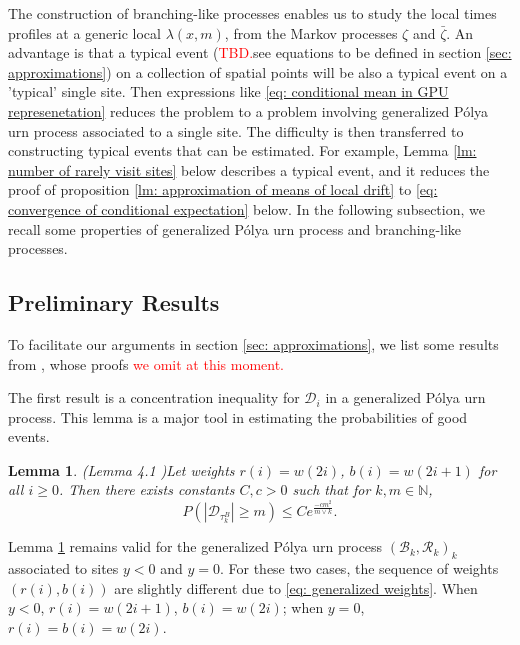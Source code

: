 \documentclass[twoside,12pt,a4paper]{article}
\newtheorem{lemma}{Lemma}[section]
\numberwithin{equation}{section}
\newcommand{\abs}[1]{\left\vert #1 \right\vert}
\newcommand\TBD{\textcolor{red}{TBD.}}
\begin{document}
	
	
	The construction of branching-like processes enables us to study the local times profiles at a generic local $\lambda(x,m)$, from the Markov processes $\zeta$ and $\bar{\zeta}$. An advantage is that a typical event (\TBD{see equations to be defined in section \ref{sec: approximations}}) on a collection of spatial points will be also a typical event on a 'typical' single site. Then expressions like \eqref{eq: conditional mean in GPU represenetation} reduces the problem to a problem involving generalized P\'{o}lya urn process associated to a single site. The difficulty is then transferred to constructing typical events that can be estimated. For example, Lemma \ref{lm: number of rarely visit sites} below describes a typical event, and it reduces the proof of proposition \ref{lm: approximation of means of local drift} to \eqref{eq: convergence of conditional expectation} below. In the following subsection, we recall some properties of generalized P\'{o}lya urn process and branching-like processes.
	
	\subsection{Preliminary Results}
	To facilitate our arguments in section \ref{sec: approximations}, we list some results from \cite{KMP22,T96}, whose proofs \textcolor{red}{we omit at this moment.}
	
	The first result is a concentration inequality for $\mathcal{D}_i$ in a generalized P\'{o}lya urn process. This lemma is a major tool in estimating the probabilities of good events.
	\begin{lemma}(Lemma 4.1 \cite{KMP22})\label{lm: concentration inequality}
		Let weights $r(i) = w(2i)$, $b(i)= w(2i+1) $ for all $i\geq 0$. Then there exists constants $C,c>0$ such that for $k, m \in \mathbb{N}$,
		$$
		P\left(  \abs{ \mathcal{D}_{\tau_k^B}   } \geq m \right) \leq C e^{\frac{-cm^2}{m \vee k}}.
		$$
	\end{lemma} 
	Lemma \ref{lm: concentration inequality} remains valid for the generalized P\'{o}lya urn process $(\mathcal{B}_{k},\mathcal{R}_{k})_k$ associated to sites $y<0$ and $y=0$. For these two cases, the sequence of weights $(r(i),b(i))$ are slightly different due to \eqref{eq: generalized weights}. When $y<0$, $r(i) = w(2i+1)$, $b(i)= w(2i) $; when $y=0$, $r(i) = b(i)=w(2i)$.
	
\end{document}
